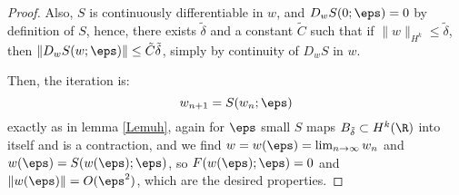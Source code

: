 \begin{proof}
Also, $S$ is continuously differentiable in $w$, and $D_wS(0;\eps) = 0$ by definition of $S$, hence, there exists $\tilde{\delta}$ and a constant $\tilde{C}$ such that if $\|w\|_{H^k} \le \tilde{\delta}$, then $\| D_wS(w;\eps) \| \le \tilde{C}\tilde{\delta}$, simply by continuity of $D_wS$ in $w$.

Then, the iteration is:
\[
w_{n+1} = S(w_n;\eps)
\]
exactly as in lemma \ref{Lemuh}, again for $\eps$ small $S$ maps $B_{\tilde{\delta}}\subset H^k(\R)$ into itself and is a contraction, and we find $w=w(\eps) = \lim_{n\to \infty} w_n$ and $w(\eps) = S(w(\eps);\eps)$, so $F(w(\eps);\eps) = 0$ and $\|w(\eps)\| = O(\eps^2)$, which are the desired properties.


\end{proof}